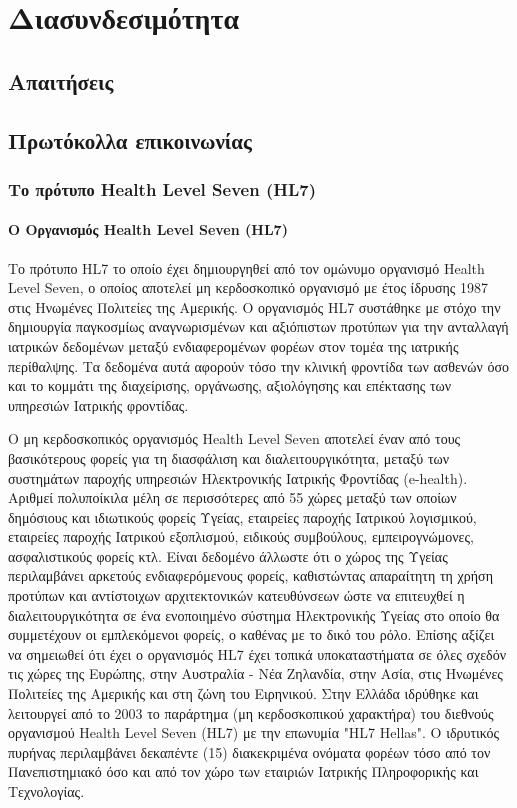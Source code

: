 \graphicspath{ {Figures/interoperability/} }
\chapter{Διασυνδεσιμότητα}\label{ch:Interoperability}
\section{Απαιτήσεις}

\section{Πρωτόκολλα επικοινωνίας}


	\subsection{Το πρότυπο Health Level Seven (HL7)}
		\subsubsection{Ο Οργανισμός Health Level Seven (HL7)}
		Το πρότυπο HL7 το οποίο έχει δημιουργηθεί από τον ομώνυμο οργανισμό Health Level Seven, ο οποίος αποτελεί μη κερδοσκοπικό οργανισμό με έτος ίδρυσης 1987 στις Ηνωμένες Πολιτείες της Αμερικής\cite{HL7Organization}\cite{blobel2003hl7}. Ο οργανισμός HL7 συστάθηκε με στόχο την δημιουργία παγκοσμίως αναγνωρισμένων και αξιόπιστων προτύπων για την ανταλλαγή ιατρικών δεδομένων μεταξύ ενδιαφερομένων φορέων στον τομέα της ιατρικής περίθαλψης. Τα δεδομένα αυτά αφορούν τόσο την κλινική φροντίδα των ασθενών όσο και το κομμάτι της διαχείρισης, οργάνωσης, αξιολόγησης και επέκτασης των υπηρεσιών Ιατρικής φροντίδας.

Ο μη κερδοσκοπικός οργανισμός Health Level Seven αποτελεί έναν από τους βασικότερους φορείς για τη διασφάλιση και διαλειτουργικότητα, μεταξύ των συστημάτων παροχής υπηρεσιών Ηλεκτρονικής Ιατρικής Φροντίδας (e-health). Αριθμεί πολυποίκιλα μέλη σε περισσότερες από 55 χώρες μεταξύ των οποίων δημόσιους και ιδιωτικούς φορείς Υγείας, εταιρείες παροχής Ιατρικού λογισμικού, εταιρείες παροχής Ιατρικού εξοπλισμού, ειδικούς συμβούλους, εμπειρογνώμονες, ασφαλιστικούς φορείς κτλ\cite{HL7Organization}. Είναι δεδομένο άλλωστε ότι ο χώρος της Υγείας περιλαμβάνει αρκετούς ενδιαφερόμενους φορείς, καθιστώντας απαραίτητη τη χρήση προτύπων και αντίστοιχων αρχιτεκτονικών κατευθύνσεων ώστε να επιτευχθεί η διαλειτουργικότητα σε ένα ενοποιημένο σύστημα Ηλεκτρονικής Υγείας στο οποίο θα συμμετέχουν οι εμπλεκόμενοι φορείς, ο καθένας με το δικό του ρόλο. Επίσης αξίζει να σημειωθεί ότι έχει ο οργανισμός HL7 έχει τοπικά υποκαταστήματα σε όλες σχεδόν τις χώρες της Ευρώπης, στην Αυστραλία - Νέα Ζηλανδία, στην Ασία, στις Ηνωμένες Πολιτείες της Αμερικής και στη ζώνη του Ειρηνικού. Στην Ελλάδα ιδρύθηκε και λειτουργεί από το 2003 το παράρτημα (μη κερδοσκοπικού χαρακτήρα) του διεθνούς οργανισμού Health Level Seven (HL7) με την επωνυμία "HL7 Hellas". Ο ιδρυτικός πυρήνας περιλαμβάνει δεκαπέντε (15) διακεκριμένα ονόματα φορέων τόσο από τον Πανεπιστημιακό όσο και από τον χώρο των εταιριών Ιατρικής Πληροφορικής και Τεχνολογίας\cite{HL7Hellas}.
